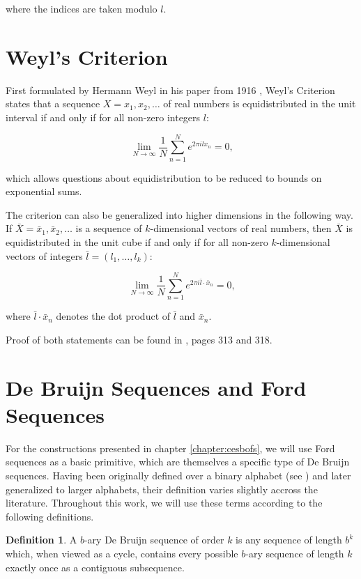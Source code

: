 \documentclass[11pt,a4paper]{tesis}
\theoremstyle{plain}
\theoremstyle{definition}
\newtheorem*{definition*}{Definition}
\begin{document}
where the indices are taken modulo $l$.

\section{Weyl's Criterion}\label{section:weyls-criterion}

First formulated by Hermann Weyl in his paper from 1916 \cite{weyl-1916}, Weyl's Criterion states that a sequence $X = x_1, x_2, \dots$ of real numbers is equidistributed in the unit interval if and only if for all non-zero integers $l$:

\begin{equation*}
  \lim_{N \to \infty} \frac{1}{N} \sum_{n = 1}^{N} e^{2 \pi i l x_n} = 0 \text{,}
\end{equation*}

which allows questions about equidistribution to be reduced to bounds on exponential sums.

The criterion can also be generalized into higher dimensions in the following way. If $\bar{X} = \bar{x}_1, \bar{x}_2, \dots$ is a sequence of $k$-dimensional vectors of real numbers, then $\bar{X}$ is equidistributed in the unit cube if and only if for all non-zero $k$-dimensional vectors of integers $\bar{l} = (l_1, \dots, l_k)$:

\begin{equation*}
  \lim_{N \to \infty} \frac{1}{N} \sum_{n = 1}^{N} e^{2 \pi i \bar{l} \cdot \bar{x}_n} = 0 \text{,}
\end{equation*}

where $\bar{l} \cdot \bar{x}_n$ denotes the dot product of $\bar{l}$ and $\bar{x}_n$.

Proof of both statements can be found in \cite{weyl-1916}, pages 313 and 318.

\section{De Bruijn Sequences and Ford Sequences}

For the constructions presented in chapter \ref{chapter:cesbofs}, we will use Ford sequences as a basic primitive, which are themselves a specific type of De Bruijn sequences. Having been originally defined over a binary alphabet (see \cite{de-bruijn-1946}) and later generalized to larger alphabets, their definition varies slightly accross the literature. Throughout this work, we will use these terms according to the following definitions.

\begin{definition*}
  A $b$-ary De Bruijn sequence of order $k$ is any sequence of length $b^k$ which, when viewed as a cycle, contains every possible $b$-ary sequence of length $k$ exactly once as a contiguous subsequence.
\end{definition*}
\end{document}
